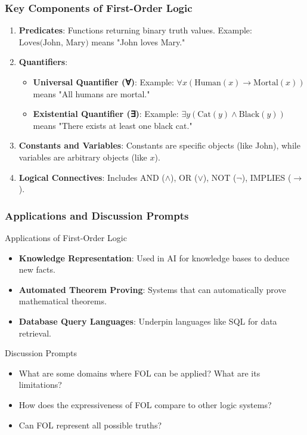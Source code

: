\documentclass[aspectratio=169]{beamer}
\begin{document}
\begin{frame}[fragile]
    \frametitle{Key Components of First-Order Logic}
    \begin{enumerate}
        \item \textbf{Predicates}: Functions returning binary truth values. Example: 
        \( \text{Loves(John, Mary)} \) means "John loves Mary."
        
        \item \textbf{Quantifiers}:
        \begin{itemize}
            \item \textbf{Universal Quantifier (∀)}: Example: \( \forall x (\text{Human}(x) \rightarrow \text{Mortal}(x)) \) means "All humans are mortal."
            \item \textbf{Existential Quantifier (∃)}: Example: \( \exists y (\text{Cat}(y) \land \text{Black}(y)) \) means "There exists at least one black cat."
        \end{itemize}
        
        \item \textbf{Constants and Variables}: Constants are specific objects (like John), while variables are arbitrary objects (like \( x \)).
        
        \item \textbf{Logical Connectives}: Includes AND (\(\land\)), OR (\(\lor\)), NOT (\(\neg\)), IMPLIES (\(\rightarrow\)).
    \end{enumerate}
\end{frame}

\begin{frame}[fragile]
    \frametitle{Applications and Discussion Prompts}
    \begin{block}{Applications of First-Order Logic}
        \begin{itemize}
            \item \textbf{Knowledge Representation}: Used in AI for knowledge bases to deduce new facts.
            \item \textbf{Automated Theorem Proving}: Systems that can automatically prove mathematical theorems.
            \item \textbf{Database Query Languages}: Underpin languages like SQL for data retrieval.
        \end{itemize}
    \end{block}

    \begin{block}{Discussion Prompts}
        \begin{itemize}
            \item What are some domains where FOL can be applied? What are its limitations?
            \item How does the expressiveness of FOL compare to other logic systems?
            \item Can FOL represent all possible truths?
        \end{itemize}
    \end{block}
\end{frame}
\end{document}
